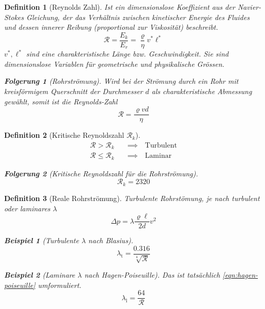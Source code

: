 \documentclass[a4paper, twocolumn]{article}
\numberwithin{equation}{section}
\theoremstyle{hsr-def}
\newtheorem{definition}{Definition}[section]
\theoremstyle{hsr-sub}
\newtheorem{result}{Folgerung}[definition]
\newtheorem{example}{Beispiel}[definition]
\begin{document}
\begin{definition}[Reynolds Zahl]
Ist ein dimensionslose Koeffizient aus der \emph{Navier-Stokes} Gleichung, der das Verh\"altnis zwischen kinetischer Energie des Fluides und dessen innerer Reibung (proportional zur Viskosit\"at) beschreibt.
\[
    \mathcal{R} = \frac{E_k}{E_r} = \frac{\varrho}{\eta} v^*\ell^*
\]
\(v^*, \ell^*\) sind eine charakteristische L\"ange bzw. Geschwindigkeit. Sie sind dimensionslose Variablen f\"ur geometrische und physikalische Gr\"ossen.

\begin{result}[Rohrstr\"omung]
Wird bei der Str\"omung durch ein Rohr mit kreisf\"ormigem Querschnitt der Durchmesser \(d\) als charakteristische Abmessung gew\"ahlt, somit ist die Reynolds-Zahl
\[
    \mathcal{R} = \frac{\varrho v d}{\eta}
\]
\end{result}

\end{definition}

\begin{definition}[Kritische Reynoldszahl \(\mathcal{R}_k\)]
\begin{align*}
    \mathcal{R} > \mathcal{R}_k
    \quad&\implies\quad\text{Turbulent} \\
    \mathcal{R} \leq \mathcal{R}_k
    \quad&\implies\quad\text{Laminar}
\end{align*}

\begin{result}[Kritische Reynoldszahl f\"ur die Rohrstr\"omung]
\[
    \mathcal{R}_k = 2320
\]
\end{result}

\end{definition}

\begin{definition}[Reale Rohrstr\"omung]
Turbulente Rohrst\"omung, je nach turbulent oder laminares \(\lambda\) 
\begin{equation} \label{eqn:real-ductstream}
    \Delta p = \lambda \frac{\varrho\ell}{2d} v^2
\end{equation}

\begin{example}[Turbulente \(\lambda\) nach Blasius]
\[
    \lambda_\text{t} = \frac{0.316}{\sqrt[4]{\mathcal{R}}}
\]
\end{example}

\begin{example}[Laminare \(\lambda\) nach Hagen-Poiseuille]
Das ist tats\"achlich \eqref{eqn:hagen-poiseuille} umformuliert.
\[
    \lambda_\text{l} = \frac{64}{\mathcal{R}}
\]
\end{example}
\end{definition}
\end{document}
